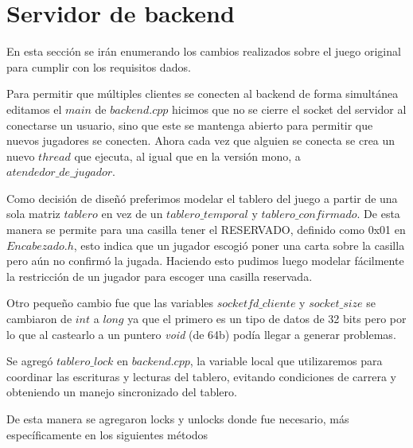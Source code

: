 \section{Servidor de backend}

En esta sección se irán enumerando los cambios realizados sobre el juego original para cumplir con los requisitos dados.

Para permitir que múltiples clientes se conecten al backend de forma simultánea editamos el $main$ de $backend.cpp$ hicimos que no se cierre el socket del servidor al conectarse un usuario, sino que este se mantenga abierto para permitir que nuevos jugadores se conecten. Ahora cada vez que alguien se conecta se crea un nuevo $thread$ que ejecuta, al igual que en la versión mono, a $atendedor\_de\_jugador$.

Como decisión de diseñó preferimos modelar el tablero del juego a partir de una sola matriz $tablero$ en vez de un $tablero\_temporal$ y $tablero\_confirmado$. De esta manera se permite para una casilla tener el RESERVADO, definido como 0x01 en $Encabezado.h$, esto indica que un jugador escogió poner una carta sobre la casilla pero aún no confirmó la jugada. Haciendo esto pudimos luego modelar fácilmente la restricción de un jugador para escoger una casilla reservada.

Otro pequeño cambio fue que las variables $socketfd\_cliente$ y $socket\_size$ se cambiaron de $int$ a $long$ ya que el primero es un tipo de datos de 32 bits pero por lo que al castearlo a un puntero \textit{void} (de 64b) podía llegar a generar problemas.

Se agregó $tablero\_lock$ en $backend.cpp$, la variable local que utilizaremos para coordinar las escrituras y lecturas del tablero, evitando condiciones de carrera y obteniendo un manejo sincronizado del tablero.

De esta manera se agregaron locks y unlocks donde fue necesario, más específicamente en los siguientes métodos

